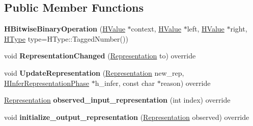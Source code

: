 \subsection*{Public Member Functions}
\begin{DoxyCompactItemize}
\item 
{\bfseries H\+Bitwise\+Binary\+Operation} (\hyperlink{classv8_1_1internal_1_1_h_value}{H\+Value} $\ast$context, \hyperlink{classv8_1_1internal_1_1_h_value}{H\+Value} $\ast$left, \hyperlink{classv8_1_1internal_1_1_h_value}{H\+Value} $\ast$right, \hyperlink{classv8_1_1internal_1_1_h_type}{H\+Type} type=H\+Type\+::\+Tagged\+Number())\hypertarget{classv8_1_1internal_1_1_h_bitwise_binary_operation_afc516f0c0ae3d5188e0b6e26acac3977}{}\label{classv8_1_1internal_1_1_h_bitwise_binary_operation_afc516f0c0ae3d5188e0b6e26acac3977}

\item 
void {\bfseries Representation\+Changed} (\hyperlink{classv8_1_1internal_1_1_representation}{Representation} to) override\hypertarget{classv8_1_1internal_1_1_h_bitwise_binary_operation_a7e45b92b33f7fa0c9f95e75830620561}{}\label{classv8_1_1internal_1_1_h_bitwise_binary_operation_a7e45b92b33f7fa0c9f95e75830620561}

\item 
void {\bfseries Update\+Representation} (\hyperlink{classv8_1_1internal_1_1_representation}{Representation} new\+\_\+rep, \hyperlink{classv8_1_1internal_1_1_h_infer_representation_phase}{H\+Infer\+Representation\+Phase} $\ast$h\+\_\+infer, const char $\ast$reason) override\hypertarget{classv8_1_1internal_1_1_h_bitwise_binary_operation_a17d93622810435a9cfd16dc712897e4b}{}\label{classv8_1_1internal_1_1_h_bitwise_binary_operation_a17d93622810435a9cfd16dc712897e4b}

\item 
\hyperlink{classv8_1_1internal_1_1_representation}{Representation} {\bfseries observed\+\_\+input\+\_\+representation} (int index) override\hypertarget{classv8_1_1internal_1_1_h_bitwise_binary_operation_ac5a2ca89b960d622e925dba78c25d3a4}{}\label{classv8_1_1internal_1_1_h_bitwise_binary_operation_ac5a2ca89b960d622e925dba78c25d3a4}

\item 
void {\bfseries initialize\+\_\+output\+\_\+representation} (\hyperlink{classv8_1_1internal_1_1_representation}{Representation} observed) override\hypertarget{classv8_1_1internal_1_1_h_bitwise_binary_operation_ac57e054081506a77c236e4a20ae51ed1}{}\label{classv8_1_1internal_1_1_h_bitwise_binary_operation_ac57e054081506a77c236e4a20ae51ed1}

\end{DoxyCompactItemize}
